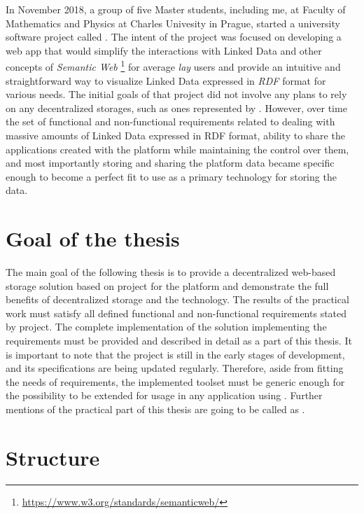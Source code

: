In November 2018, a group of five Master students, including me, at Faculty of Mathematics and Physics at Charles Univesity in Prague, started a university software project called \lpa{}. The intent of the project was focused on developing a web app that would simplify the interactions with Linked Data and other concepts of \textit{Semantic Web} \footnote{\url{https://www.w3.org/standards/semanticweb/}} for average \textit{lay} users and provide an intuitive and straightforward way to visualize Linked Data expressed in \textit{RDF} format for various needs. The initial goals of that project did not involve any plans to rely on any decentralized storages, such as ones represented by \solid{}. However, over time the set of functional and non-functional requirements related to dealing with massive amounts of Linked Data expressed in RDF format, ability to share the applications created with the platform while maintaining the control over them, and most importantly storing and sharing the \lpa{} platform data became specific enough to become a perfect fit to use \solid{} as a primary technology for storing the data. 
 
\section*{Goal of the thesis}
The main goal of the following thesis is to provide a decentralized web-based storage solution based on \solid{} project for the \lpa{} platform and demonstrate the full benefits of decentralized storage and the \solid{} technology. The results of the practical work must satisfy all defined functional and non-functional requirements stated by \lpa{} project. The complete implementation of the solution implementing the requirements must be provided and described in detail as a part of this thesis. It is important to note that the \solid{} project is still in the early stages of development, and its specifications are being updated regularly. Therefore, aside from fitting the needs of \lpa{} requirements, the implemented toolset must be generic enough for the possibility to be extended for usage in any application using \solid{}. Further mentions of the practical part of this thesis are going to be called as \lpas{}.

\section*{Structure}


